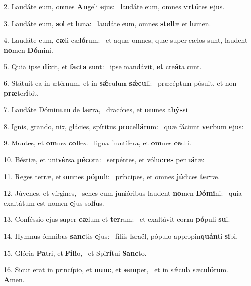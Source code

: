 2. Laudáte eum, omnes \textbf{An}geli \textbf{e}jus: \ast\  laudáte eum, omnes vir\textbf{tú}tes \textbf{e}jus.\

3. Laudáte eum, \textbf{sol} et \textbf{lu}na: \ast\  laudáte eum, omnes \textbf{stel}læ et \textbf{lu}men.\

4. Laudáte eum, \textbf{cæ}li cæ\textbf{ló}rum: \ast\  et aquæ omnes, quæ super cælos sunt, laudent \textbf{no}men \textbf{Dó}mini.\

5. Quia ipse \textbf{di}xit, et \textbf{fac}\textbf{ta} sunt: \ast\  ipse mandávit, \textbf{et} cre\textbf{á}ta sunt.\

6. Státuit ea in ætérnum, et in \textbf{sǽ}culum \textbf{sǽ}\textbf{cu}li: \ast\  præcéptum pósuit, et non \textbf{præ}ter\textbf{í}bit.\

7. Laudáte Dómi\textbf{num} de \textbf{ter}ra, \ast\  dracónes, et \textbf{om}nes a\textbf{býs}si.\

8. Ignis, grando, nix, glácies, spíritus \textbf{pro}cel\textbf{lá}rum: \ast\  quæ fáciunt \textbf{ver}bum \textbf{e}jus:\

9. Montes, et \textbf{om}nes \textbf{col}les: \ast\  ligna fructífera, et \textbf{om}nes \textbf{ce}dri.\

10. Béstiæ, et uni\textbf{vér}sa \textbf{pé}\textbf{co}ra: \ast\  serpéntes, et vólu\textbf{cres} pen\textbf{ná}tæ:\

11. Reges terræ, et \textbf{om}nes \textbf{pó}\textbf{pu}li: \ast\  príncipes, et omnes \textbf{jú}dices \textbf{ter}ræ.\

12. Júvenes, et vírgines, \dag\  senes cum junióribus laudent \textbf{no}men \textbf{Dó}\textbf{mi}ni: \ast\  quia exaltátum est nomen \textbf{e}jus so\textbf{lí}us.\

13. Conféssio ejus super \textbf{cæ}lum et \textbf{ter}ram: \ast\  et exaltávit cornu \textbf{pó}puli \textbf{su}i.\

14. Hymnus ómnibus \textbf{sanc}tis \textbf{e}jus: \ast\  fíliis Israël, pópulo appropin\textbf{quán}ti \textbf{si}bi.\

15. Glória \textbf{Pa}tri, et \textbf{Fí}\textbf{li}o, \ast\  et Spi\textbf{rí}tui \textbf{Sanc}to.\

16. Sicut erat in princípio, et \textbf{nunc}, et \textbf{sem}per, \ast\  et in sǽcula sæcu\textbf{ló}rum. \textbf{A}men.\

